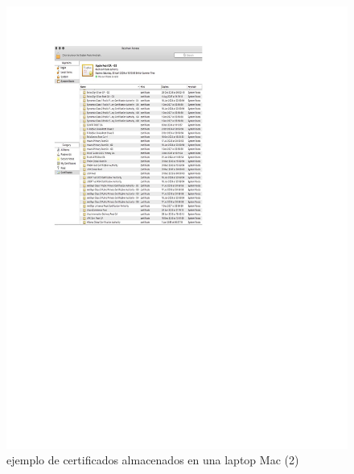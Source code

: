 \documentclass[12pt]{report} %
\begin{document}
\begin{figure}
\centering
\includegraphics[width=0.85\columnwidth]{imagenes/otroejcertalmacenadoenlaptop.pdf}
\caption{ejemplo de certificados almacenados en una laptop Mac (2)}
\label{Fig.ejemploclmacenamientodecertificadodefirma}
\end{figure} 
\end{document}

